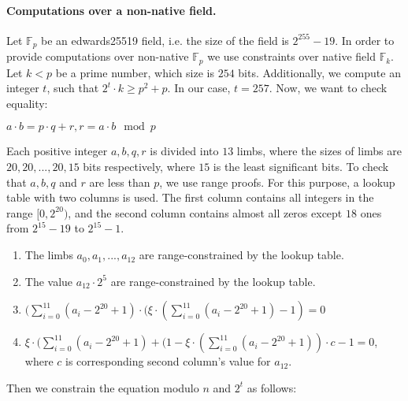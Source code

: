 \paragraph{Computations over a non-native field.}
Let $\mathbb{F}_p$ be an edwards25519 field, i.e. the size of the field is $2^{255} - 19$.
In order to provide computations over non-native $\mathbb{F}_p$ we use constraints over native field $\mathbb{F}_k$.
Let $k < p$ be a prime number, which size is $254$ bits.
Additionally, we compute an integer $t$, such that $2^t \cdot k \geq p^2 + p$.
In our case, $t = 257$.
Now, we want to check equality:
\begin{center}
$a\cdot b = p \cdot q + r, r = a\cdot b \mod p$
\end{center}
Each positive integer $a, b, q, r$ is divided into $13$ limbs, where the sizes of limbs are $20, 20, ..., 20, 15$ bits respectively, where $15$ is the least significant bits.
To check that $a, b, q$ and $r$ are less than $p$, we use range proofs.
For this purpose, a lookup table with two columns is used.
The first column contains all integers in the range $[0, 2^{20})$, and the second column contains almost all zeros except $18$ ones from $2^{15} - 19$ to $2^{15} - 1$.
\begin{enumerate}
\item The limbs $a_0, a_1, ..., a_{12}$ are range-constrained by the lookup table.
\item The value $a_{12} \cdot 2^5$ are range-constrained by the lookup table.
\item $ (\sum_{i = 0}^{11} (a_i - 2^{20} + 1) \cdot (\xi \cdot (\sum_{i = 0}^{11} (a_i - 2^{20} + 1) - 1) = 0$
\item $\xi \cdot (\sum_{i = 0}^{11} (a_i - 2^{20} + 1) + (1 - \xi \cdot (\sum_{i = 0}^{11} (a_i - 2^{20} + 1))\cdot c - 1 = 0$, where $c$ is corresponding second column's value for $a_12$.
\end{enumerate}
Then we constrain the equation modulo $n$ and $2^t$ as follows:
